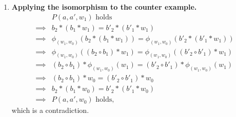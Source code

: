\begin{proofE}
\begin{enumerate}
    \item \textbf{Applying the isomorphism to the counter example.}
    \begin{align}
        & P(a, a', w_{1}) \text{ holds}  \\
        \implies & b_{2} \ast (b_{1} \ast w_{1}) = b'_{2} \ast (b'_{1} \ast w_{1}) \\
        \implies & \phi_{(w_{1}, w_{0})}(b_{2} \ast (b_{1} \ast w_{1})) = \phi_{(w_{1}, w_{0})}(b'_{2} \ast (b'_{1} \ast w_{1})) \\
        \implies & \phi_{(w_{1}, w_{0})}((b_{2} \circ b_{1}) \ast w_{1}) = \phi_{(w_{1}, w_{0})}((b'_{2} \circ b'_{1}) \ast w_{1}) \\
        \implies & (b_{2} \circ b_{1}) \ast \phi_{(w_{1}, w_{0})}(w_{1}) = (b'_{2} \circ b'_{1}) \ast \phi_{(w_{1}, w_{0})}(w_{1}) \\
        \implies & (b_{2} \circ b_{1}) \ast w_{0} = (b'_{2} \circ b'_{1}) \ast w_{0} \\
        \implies & b_{2} \ast (b_{1} \ast w_{0}) = b'_{2} \ast (b'_{1} \ast w_{0}) \\
        \implies & P(a, a', w_{0}) \text{ holds},
    \end{align}
    which is a contradiction.
\end{enumerate}
\end{proofE}



